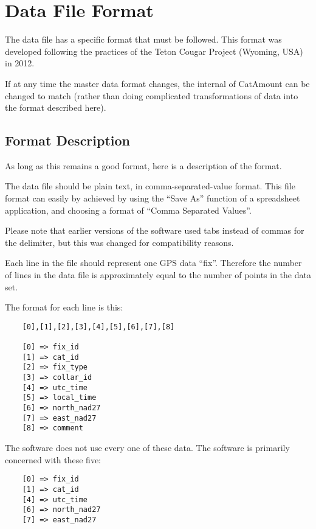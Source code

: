 \chapter{Data File Format}
\hypertarget{data-file-format}{}

The data file has a specific format that must be followed. This format
was developed following the practices of the Teton Cougar Project
(Wyoming, USA) in 2012.

If at any time the master data format changes, the internal of
CatAmount can be changed to match (rather than doing complicated
transformations of data into the format described here).

\section{Format Description}

As long as this remains a good format, here is a description of the format.

The data file should be plain text, in comma-separated-value format.
This file format can easily by achieved by using the ``Save As''
function of a spreadsheet application, and choosing a format of
``Comma Separated Values''.

Please note that earlier versions of the software used tabs instead of
commas for the delimiter, but this was changed for compatibility
reasons.

Each line in the file should represent one GPS data ``fix''. Therefore
the number of lines in the data file is approximately equal to the
number of points in the data set.

The format for each line is this:

\begin{verbatim}
    [0],[1],[2],[3],[4],[5],[6],[7],[8]

    [0] => fix_id
    [1] => cat_id
    [2] => fix_type
    [3] => collar_id
    [4] => utc_time
    [5] => local_time
    [6] => north_nad27
    [7] => east_nad27
    [8] => comment
\end{verbatim}

The software does not use every one of these data. The software is primarily
concerned with these five:

\begin{verbatim}
    [0] => fix_id
    [1] => cat_id
    [4] => utc_time
    [6] => north_nad27
    [7] => east_nad27
\end{verbatim}

